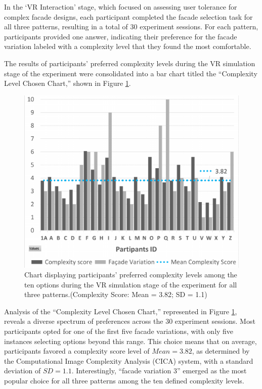 In the `VR Interaction' stage, which focused on assessing user tolerance for complex facade designs, each participant completed the facade selection task for all three patterns, resulting in a total of 30 experiment sessions.
For each pattern, participants provided one answer, indicating their preference for the facade variation labeled with a complexity level that they found the most comfortable.


The results of participants' preferred complexity levels during the VR simulation stage of the experiment were consolidated into a bar chart titled the ``Complexity Level Chosen Chart,'' shown in Figure \ref{fig:ComplexityLevelChosenChart}.

    \begin{figure}[htb]
        \centering
        \includegraphics[width=\linewidth]{Images/ComplexityLevelChosenChart}
        \caption{Chart displaying participants' preferred complexity levels among the ten options during the VR simulation stage of the experiment for all three patterns.(Complexity Score: Mean = 3.82; SD = 1.1)}
        \label{fig:ComplexityLevelChosenChart}
    \end{figure}

Analysis of the ``Complexity Level Chosen Chart,'' represented in Figure \ref{fig:ComplexityLevelChosenChart}, reveals a diverse spectrum of preferences across the 30 experiment sessions.
Most participants opted for one of the first five facade variations, with only five instances selecting options beyond this range.
This choice means that on average, participants favored a complexity score level of \(Mean = 3.82\), as determined by the Computational Image Complexity Analysis (CICA) system, with a standard deviation of \(SD = 1.1\).
 Interestingly, ``facade variation 3'' emerged as the most popular choice for all three patterns among the ten defined complexity levels.

